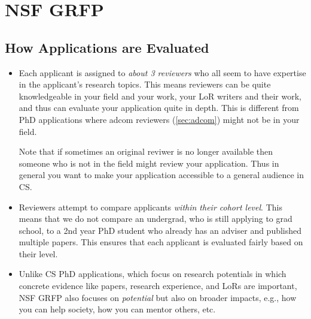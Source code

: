 \documentclass[oneside,11pt,dvipsnames]{book}
\newenvironment{commentbox}[1][]{
  \small
  \begin{mybox}
    {\small \textbf{#1}}
  }{
  \end{mybox}
}
\begin{document}
    

\section{NSF GRFP}\label{sec:nsf-grfp}

\subsection{How Applications are Evaluated}

\begin{itemize}
\item Each applicant is assigned to \emph{about 3 reviewers} who all seem to have expertise in the applicant's research topics. This means reviewers can be quite knowledgeable in your field and your work, your LoR writers and their work, and thus can evaluate your application quite in depth. This is different from PhD applications where adcom reviewers (\autoref{sec:adcom}) might not be in your field.

Note that if sometimes an original reviwer is no longer available then someone who is not in the field might review your application.  Thus in general you want to make your application accessible to a general audience in CS.

\item Reviewers attempt to compare applicants \emph{within their cohort level}.  This means that we do not compare an undergrad, who is still applying to grad school, to a 2nd year PhD student who already has an adviser and published multiple papers. This ensures that each applicant is evaluated fairly based on their level.

\item Unlike CS PhD applications, which focus on research potentials in which concrete evidence like papers, research experience, and LoRs are important, NSF GRFP also focuses on \emph{potential} but also on broader impacts, e.g., how you can help society, how you can mentor others, etc. 

\end{itemize}
\end{document}
